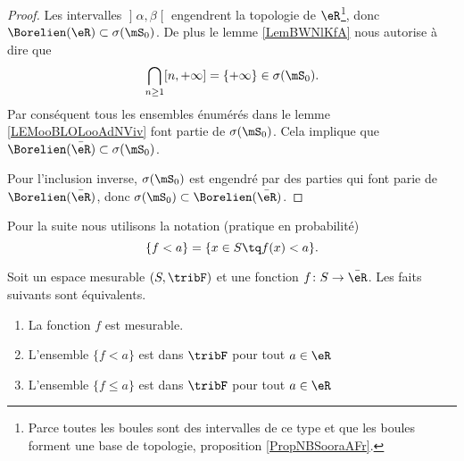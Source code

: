 \begin{proof}
Les intervalles \( \mathopen] \alpha , \beta \mathclose[\) engendrent la topologie de \( \eR\)\footnote{Parce toutes les boules sont des intervalles de ce type et que les boules forment une base de topologie, proposition \ref{PropNBSooraAFr}.}, donc \( \Borelien(\eR)\subset\sigma(\mS_0)\). De plus le lemme \ref{LemBWNlKfA} nous autorise à dire que 
    \begin{equation}
        \bigcap_{n\geq 1}\mathopen[ n , +\infty \mathclose]=\{ +\infty \}\in\sigma(\mS_0).
    \end{equation}
    Par conséquent tous les ensembles énumérés dans le lemme \ref{LEMooBLOLooAdNViv} font partie de \( \sigma(\mS_0)\). Cela implique que \( \Borelien(\bar\eR)\subset\sigma(\mS_0)\).

    Pour l'inclusion inverse, \( \sigma(\mS_0)\) est engendré par des parties qui font parie de \( \Borelien(\bar \eR)\), donc \( \sigma(\mS_0)\subset\Borelien(\bar \eR)\).
\end{proof}

Pour la suite nous utilisons la notation (pratique en probabilité)
\begin{equation}
    \{ f<a \}=\{ x\in S\tq f(x)<a \}.
\end{equation}


\begin{theorem}
    Soit un espace mesurable \( (S,\tribF)\) et une fonction \( f\colon S\to \bar \eR\). Les faits suivants sont équivalents.
    \begin{enumerate}
        \item\label{ITEMooHAMHooYLqUhVi}
            La fonction \( f\) est mesurable.
        \item\label{ITEMooHAMHooYLqUhVii}
            L'ensemble \( \{ f<a \}\) est dans \( \tribF\) pour tout \( a\in \eR\)
        \item\label{ITEMooHAMHooYLqUhViii}
            L'ensemble \( \{ f\leq a \}\) est dans \( \tribF\) pour tout \( a\in \eR\)
    \end{enumerate}
\end{theorem}

